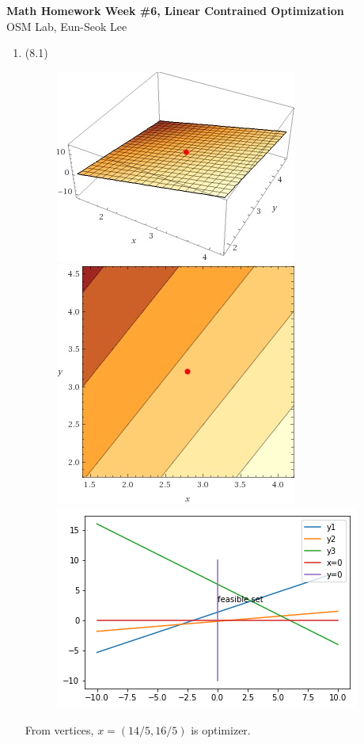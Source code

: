 \documentclass[letterpaper,12pt]{article}
\theoremstyle{definition}
\begin{document}
\begin{flushleft}
   \textbf{\large{Math Homework Week \#6, Linear Contrained Optimization}} \\[5pt]
   OSM Lab, Eun-Seok Lee \\[5pt]

\end{flushleft}

\vspace{5mm}

\begin{enumerate}



	\item (8.1) \\
\begin{figure}[htbp]
\begin{center}
    \includegraphics[scale=0.9]{8p1a}
    \includegraphics[scale=0.5]{8p1b}
    \includegraphics[scale=0.5]{8p1c}
    \caption{} \label{fig:label}
\end{center}
\end{figure}
	From vertices, $x = (14/5, 16/5)$ is optimizer.



\end{enumerate}
\end{document}

